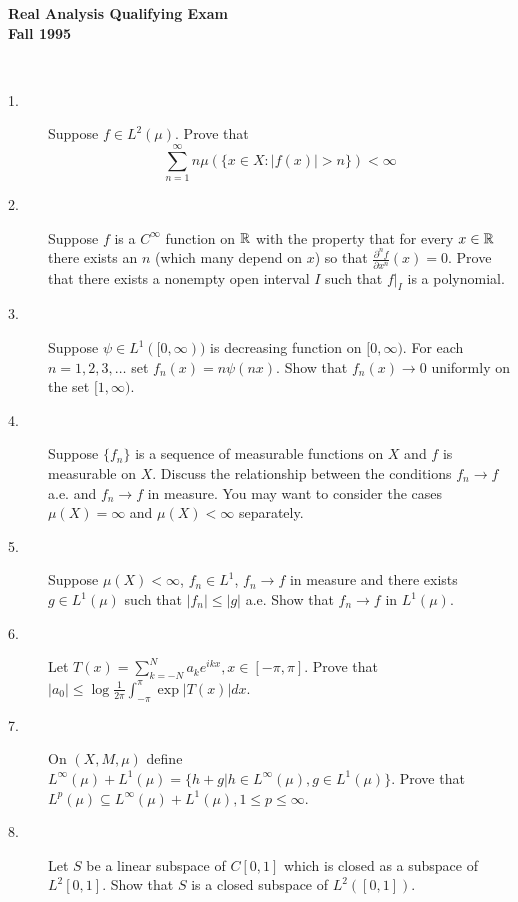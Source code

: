 \documentclass{article}
\begin{document}






\begin{center}\begin{LARGE}
{\bf Real Analysis Qualifying Exam}\\ 
{\bf Fall 1995}\\ \end{LARGE}
\end{center}
\vspace{0.1in}
\noindent\hrulefill\\

\begin{description}

\item[1.]
Suppose $f \in L^2 (\mu)$. Prove that
$$\sum^\infty_{n=1} n \mu (\{x \in X : |f(x)| > n\}) < \infty$$

\item[2.]
Suppose $f$ is a $C^\infty$ function on $\Bbb R$ with the property that
for every $x \in \Bbb R$ there exists an $n$ (which many depend on $x$)
so that $\frac{\partial^n f}{\partial x^n} (x) = 0$. Prove that there exists
a nonempty open interval $I$ such that $f|_I$ is a polynomial.


\item[3.]
Suppose  $\psi \in L^1 ([0, \infty))$ is decreasing function on
$[0, \infty)$. For each $n=1,2,3, \dots$ set $f_n(x) = n \psi(nx)$.
Show that $f_n(x) \to 0$ uniformly on the set $[1, \infty)$.

\item[4.]
Suppose $\{f_n\}$ is a sequence of measurable functions on $X$ and $f$ is
measurable on $X$. Discuss the relationship between the conditions $f_n \to f$
a.e. and $f_n \to f$ in measure. You may want to consider the cases
$\mu (X) = \infty$ and $\mu(X) < \infty$ separately.

\item[5.]
Suppose $\mu(X) < \infty$, $f_n \in L^1$, $f_n \to f$ in measure and there
exists $g \in L^1(\mu)$ such that $|f_n| \leq |g|$ a.e. Show that
$f_n \to f$ in $L^1(\mu)$.

\item[6.]
Let $T(x) = \sum^N_{k= -N} a_k e^{ikx}, x \in [-\pi, \pi]$. Prove that
$|a_0| \leq \log \frac{1}{2\pi} \int^\pi_{-\pi} \exp |T(x)|dx$.

\item[7.]
On $(X,M, \mu)$ define $L^\infty(\mu) + L^1(\mu) = \{h + g| h \in L^\infty
   (\mu), g \in L^1(\mu)\}$. Prove that
$L^p(\mu) \subseteq L^\infty (\mu) + L^1(\mu), 1 \leq p \leq \infty$.

\item[8.]
Let $S$ be a linear subspace of $C[0,1]$ which is closed as a subspace of
$L^2[0,1]$. Show that $S$ is a closed subspace of $L^2([0,1])$.





\end{description}    
\end{document}
